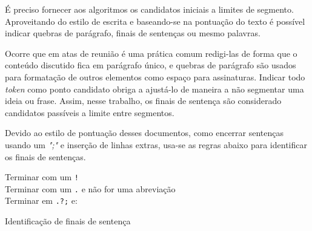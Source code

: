 	É preciso fornecer aos algoritmos os candidatos iniciais a limites de segmento. Aproveitando do estilo de escrita e baseando-se na pontuação do texto é possível indicar quebras de parágrafo, finais de sentenças ou mesmo palavras. 

	Ocorre que em atas de reunião é uma prática comum redigi-las de forma que o conteúdo discutido fica em parágrafo único, e quebras de parágrafo são usados para formatação de outros elementos como espaço para assinaturas. Indicar todo \textit{token} como ponto candidato obriga a ajustá-lo de maneira a não segmentar uma ideia ou frase. Assim, nesse trabalho, os finais de sentença são considerado candidatos passíveis a limite entre segmentos. 
	
	Devido ao estilo de pontuação desses documentos, como encerrar sentenças usando um \textit{";"} e inserção de linhas extras, usa-se as regras abaixo para identificar os finais de sentenças.  


\begin{algorithm}

	
	
	 {	

	Terminar com um \texttt{!}\\
	Terminar com um \texttt{.} e não for uma abreviação\\
	Terminar em \texttt{.?;} e:
	}
	
	\caption{Identificação de finais de sentença}
\end{algorithm}

















